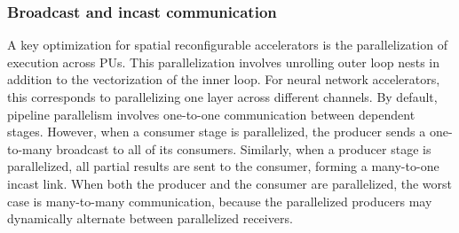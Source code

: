 \subsubsection{Broadcast and incast communication} 
A key optimization for spatial reconfigurable accelerators is the parallelization of execution across PUs.
This parallelization involves unrolling outer loop nests in addition to the vectorization of the inner loop.
For neural network accelerators, this corresponds to parallelizing one layer across different channels. 
By default, pipeline parallelism involves one-to-one communication between dependent stages.
However, when a consumer stage is parallelized, the producer sends a one-to-many broadcast to all of its consumers.
Similarly, when a producer stage is parallelized, all partial results are sent to the consumer, forming a many-to-one incast link. 
When both the producer and the consumer are parallelized, 
the worst case is many-to-many communication, because the parallelized producers may dynamically alternate between parallelized receivers. 

